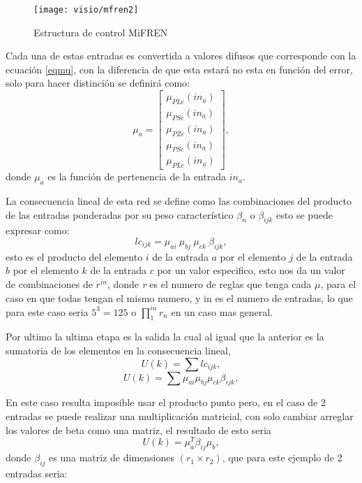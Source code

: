     \begin{figure}[h]
    	\centering
    	\texttt{[image: visio/mfren2]}
    	\caption{Estructura de control MiFREN}
    	\label{fig:mfren2}
    \end{figure}
    
    Cada una de estas entradas es convertida a valores difusos que corresponde con la ecuación \ref{eqmu}, con la diferencia de que esta estará no esta en función del error, solo para hacer distinción se definirá como:
    \begin{equation}
    \label{eqmmu}
    \mu_a=\begin{bmatrix}
    	\mu_{PLe}(in_a) \\ 
    	\mu_{PSe}(in_a)\\ 
    	\mu_{PZe}(in_a)\\ 
    	\mu_{PSe}(in_a)\\ 
    	\mu_{PLe}(in_a)
    \end{bmatrix}  ,
\end{equation}
    donde $\mu_a$ es la función de pertenencia de la entrada $in_a$.
    
    La consecuencia lineal de esta red se define como las combinaciones del producto de las entradas ponderadas por su peso característico $\beta_n$ o $\beta_{ijk}$
    esto se puede expresar como: \begin{equation}
    lc_{ijk}=\mu_{ai}\ \mu_{bj} \ \mu_{ck} \ \beta_{ijk},
    \end{equation}
    esto es el producto del elemento $i$ de la entrada $a$ por el elemento $j$ de la entrada $b$ por el elemento $k$ de la entrada $c$ por un valor especifico, esto nos da un valor de combinaciones de $r^{in}$, donde \textit{r} es el numero de reglas que tenga cada $\mu$, para el caso en que todas tengan el mismo numero, y in es el numero de entradas, lo que para este caso seria $5^3 = 125$ o $\prod_{1}^{in} r_n$
    en un caso mas general.
    
    Por ultimo la ultima etapa es la salida la cual al igual que la anterior es la sumatoria de los elementos en la consecuencia lineal, \begin{equation}    U(k)= \sum lc_{ijk} ,
    \end{equation}
    \begin{equation}
    U(k)= \sum  \mu_{ai} \mu_{bj} \mu_{ck} \beta_{ijk}  ,
    \end{equation}
    
     En este caso resulta imposible usar el producto punto pero, en el caso de 2 entradas se puede realizar una multiplicación matricial, con solo cambiar arreglar los valores de beta como una matriz, el resultado de esto seria \begin{equation}
     \label{multu}
     U(k)= \mu_{a}^{T} \beta_{ij} \mu_{b} ,
     \end{equation}  donde $\beta_{ij}$ es una matriz de dimensiones $(r_1 \times r_2)$, que para este ejemplo de 2 entradas seria:
     
